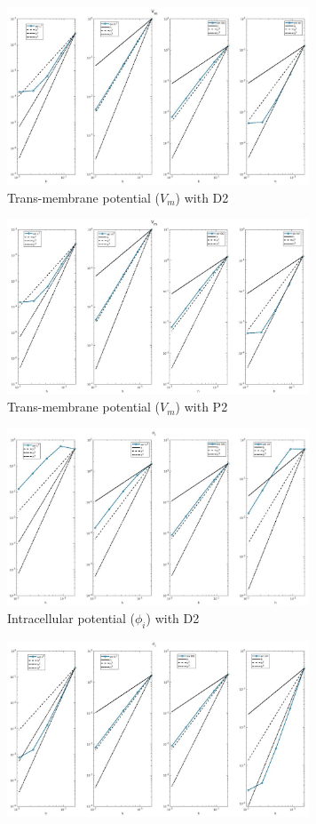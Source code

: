\documentclass[a4paper,11pt]{article}
\begin{document}
\begin{figure}[h]\caption{Comparison between Dubiner and FEM with second order polynomials} \label{P2-D2_plot}
\begin{subfigure}{0.5\textwidth}
\includegraphics[width = 9cm]{./D2_Vm_1.jpg}
\caption{Trans-membrane potential  ($V_m$) with D2}
\end{subfigure}
\begin{subfigure}{0.5\textwidth}
\includegraphics[width =9cm]{./P2_Vm_1.jpg}
\caption{Trans-membrane potential  ($V_m$) with P2}
\end{subfigure}
\begin{subfigure}{0.5\textwidth}
\includegraphics[width = 9cm]{./D2_Phii_1.jpg}
\caption{Intracellular potential ($\phi_i$) with D2}
\end{subfigure}
\begin{subfigure}{0.5\textwidth}
\includegraphics[width =9cm]{./P2_Phii_1.jpg}

\end{subfigure}
\end{figure}
\end{document}
